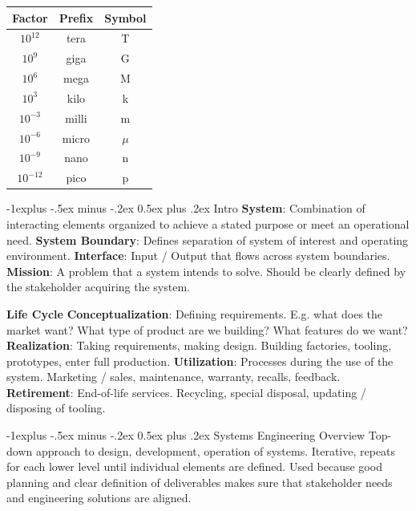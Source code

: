 \documentclass[letterpaper, 8pt]{extarticle}
\makeatletter
\renewcommand{\section}{\@startsection{section}{1}{0mm}%
                                {-1explus -.5ex minus -.2ex}%
                                {0.5ex plus .2ex}%
                                {\normalfont\small\bfseries}}
\renewcommand{\subsection}{\@startsection{subsection}{2}{0mm}%
                                {-1explus -.5ex minus -.2ex}%
                                {0.5ex plus .2ex}%
                                {\normalfont\tiny\bfseries}}
\makeatother
\begin{document}
\begin{multicols*}{5}
\begin{tabular}{| c | c | c |}
    \hline
    \textbf{Factor} & \textbf{Prefix} & \textbf{Symbol} \\
    \hline
    $10^{12}$ & tera & T \\
    $10^{9}$ & giga & G \\
    $10^{6}$ & mega & M \\
    $10^{3}$ & kilo & k \\
    $10^{-3}$ & milli & m \\
    $10^{-6}$ & micro & $\mu$ \\
    $10^{-9}$ & nano & n \\
    $10^{-12}$ & pico & p \\
    \hline
\end{tabular}
\section{Intro}
\textbf{System}:
Combination of interacting elements organized
to achieve a stated purpose or meet an operational need.
\textbf{System Boundary}:
Defines separation of system of interest and operating environment.
\textbf{Interface}:
Input / Output that flows across system boundaries.
\textbf{Mission}:
A problem that a system intends to solve.
Should be clearly defined by the stakeholder acquiring the system.

\textbf{Life Cycle}
\textbf{Conceptualization}:
Defining requirements.
E.g. what does the market want?
What type of product are we building?
What features do we want?
\textbf{Realization}:
Taking requirements, making design.
Building factories, tooling, prototypes, enter full production.
\textbf{Utilization}:
Processes during the use of the system.
Marketing / sales, maintenance, warranty, recalls, feedback.
\textbf{Retirement}:
End-of-life services.
Recycling, special disposal, updating / disposing of tooling.

\subsection{Systems Engineering Overview}
Top-down approach to design, development, operation of systems.
Iterative, repeats for each lower level until individual elements are defined.
Used because good planning and clear definition of deliverables makes sure that
stakeholder needs and engineering solutions are aligned.


\end{multicols*}
\end{document}
